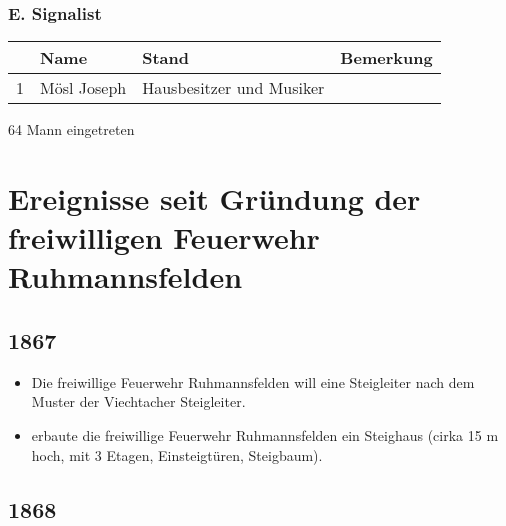 \documentclass[12pt,a4paper]{book}
\begin{document}
\subsection*{E. Signalist}

\begin{tabular}{rlll}
& Name & Stand & Bemerkung\\
\hline
1 & Mösl Joseph & Hausbesitzer und Musiker\\
\end{tabular}

64 Mann eingetreten

\chapter[Ereignisse seit Gründung]{Ereignisse seit Gründung der freiwilligen
Feuerwehr Ruhmannsfelden}

\section*{1867}

\begin{itemize}
\item Die freiwillige Feuerwehr Ruhmannsfelden will eine Steigleiter nach dem
Muster der Viechtacher Steigleiter.

\item erbaute die freiwillige Feuerwehr Ruhmannsfelden ein Steighaus (cirka 15 m
hoch, mit 3 Etagen, Einsteigtüren, Steigbaum).
\end{itemize}

\section*{1868}
\end{document}
